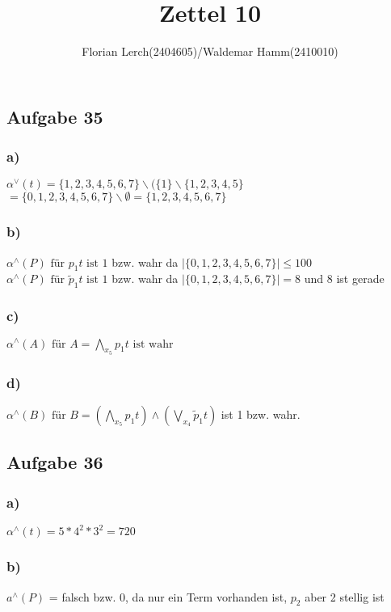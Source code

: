 \documentclass[11pt]{amsart}
\title{Zettel 10}
\author{Florian Lerch(2404605)/Waldemar Hamm(2410010)}
\begin{document}
\maketitle

\subsection{Aufgabe 35}

\subsubsection{a)}
\( \alpha^{\vee}(t) = \{1,2,3,4,5,6,7\} \backslash ( \{1\} \backslash \{1,2,3,4,5\} \) \\
\( = \{0,1,2,3,4,5,6,7\} \backslash \emptyset = \{1,2,3,4,5,6,7\} \) \)

\subsubsection{b)}
\( \alpha^{\wedge}(P) \mbox{ für } p_1t \mbox{ ist } 1\) bzw. wahr da \( | \{0,1,2,3,4,5,6,7\} | \leq 100 \) \\
\( \alpha^{\wedge}(P) \mbox{ für } \tilde{p}_1t \mbox{ ist } 1\) bzw. wahr da \( | \{0,1,2,3,4,5,6,7\} | = 8\) und 8 ist gerade \\

\subsubsection{c)}
\( \alpha^{\wedge}(A) \mbox{ für } A = \bigwedge_{x_5}p_1t \mbox{ ist wahr} \)

\subsubsection{d)}
\( \alpha^{\wedge}(B) \mbox{ für } B = (\bigwedge_{x_5}p_1t)\wedge(\bigvee_{x_4}\tilde{p}_1t) \) ist 1 bzw. wahr.

\subsection{Aufgabe 36}

\subsubsection{a)}
\( \alpha^{\wedge}(t) =  5*4^2*3^2 = 720 \)

\subsubsection{b)}
\( a^{\wedge}(P) \) = falsch bzw. 0, da nur ein Term vorhanden ist, $p_2$ aber 2 stellig ist
\end{document}
